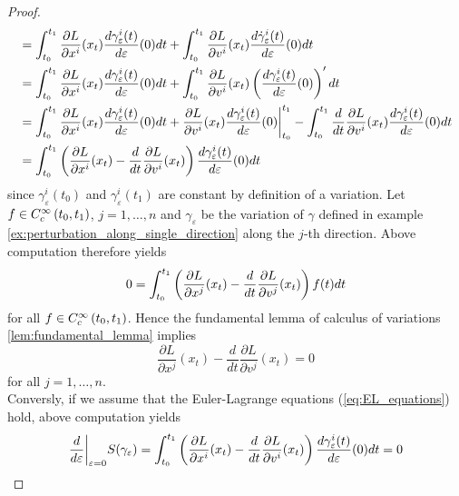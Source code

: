 \begin{proof}
\begin{align*}
		&= \int_{t_0}^{t_1} \frac{\partial L}{\partial x^i}(x_t)\frac{d\gamma_\varepsilon^i(t)}{d\varepsilon}(0)dt + \int_{t_0}^{t_1}\frac{\partial L}{\partial v^i}(x_t)\frac{d\dot{\gamma}_\varepsilon^i(t)}{d\varepsilon}(0)dt\\
		&= \int_{t_0}^{t_1} \frac{\partial L}{\partial x^i}(x_t)\frac{d\gamma_\varepsilon^i(t)}{d\varepsilon}(0)dt + \int_{t_0}^{t_1}\frac{\partial L}{\partial v^i}(x_t)\del[3]{\frac{d\gamma_\varepsilon^i(t)}{d\varepsilon}(0)}'dt\\
		&= \int_{t_0}^{t_1} \frac{\partial L}{\partial x^i}(x_t)\frac{d\gamma_\varepsilon^i(t)}{d\varepsilon}(0)dt + \frac{\partial L}{\partial v^i}(x_t)\frac{d\gamma_\varepsilon^i(t)}{d\varepsilon}(0)\bigg\vert_{t_0}^{t_1} - \int_{t_0}^{t_1} \frac{d}{dt}\frac{\partial L}{\partial v^i}(x_t)\frac{d\gamma_\varepsilon^i(t)}{d\varepsilon}(0)dt\\
		&= \int_{t_0}^{t_1} \del[3]{\frac{\partial L}{\partial x^i}(x_t) - \frac{d}{dt}\frac{\partial L}{\partial v^i}(x_t)}\frac{d\gamma_\varepsilon^i(t)}{d\varepsilon}(0)dt 
	\end{align*}
	\noindent since $\gamma^i_\varepsilon(t_0)$ and $\gamma^i_\varepsilon(t_1)$ are constant by definition of a variation. Let $f \in C^\infty_c\intoo[0]{t_0,t_1}$, $j = 1,\dots,n$ and $\gamma_\varepsilon$ be the variation of $\gamma$ defined in example \ref{ex:perturbation_along_single_direction} along the $j$-th direction. Above computation therefore yields
	\begin{equation*}
		0 = \int_{t_0}^{t_1} \del[3]{\frac{\partial L}{\partial x^j}(x_t) - \frac{d}{dt}\frac{\partial L}{\partial v^j}(x_t)}f(t) dt
	\end{equation*}
	\noindent for all $f \in C^\infty_c\intoo[0]{t_0,t_1}$. Hence the fundamental lemma of calculus of variations \ref{lem:fundamental_lemma} implies
	\begin{equation*}
		\frac{\partial L}{\partial x^j}(x_t) - \frac{d}{dt}\frac{\partial L}{\partial v^j}(x_t) = 0
	\end{equation*}
	\noindent for all $j = 1,\dots,n$.\\
	Conversly, if we assume that the Euler-Lagrange equations (\ref{eq:EL_equations}) hold, above computation yields
	\begin{equation*}
		\frac{d}{d\varepsilon}\bigg\vert_{\varepsilon = 0} S(\gamma_\varepsilon) = \int_{t_0}^{t_1} \del[3]{\frac{\partial L}{\partial x^i}(x_t) - \frac{d}{dt}\frac{\partial L}{\partial v^i}(x_t)}\frac{d\gamma_\varepsilon^i(t)}{d\varepsilon}(0)dt = 0
	\end{equation*}

\end{proof}

